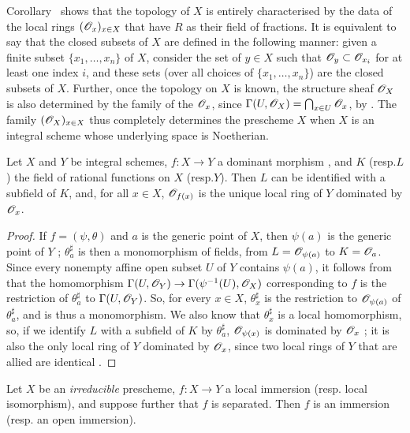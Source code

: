 \begin{env}[8.2.6]
\label{I.8.2.6}
Corollary~ shows that the topology of $X$ is entirely characterised by the data of the local rings $(\mathscr{O}_x)_{x\in X}$ that have $R$ as their field of fractions.
It is equivalent to say that the closed subsets of $X$ are defined in the following manner: given a finite subset $\{x_1,\ldots,x_n\}$ of $X$, consider the set of $y\in X$ such that $\mathscr{O}_y\subset\mathscr{O}_{x_i}$ for at least one index $i$, and these sets (over all choices of $\{x_1,\ldots,x_n\}$) are the closed subsets of $X$.
Further, once the topology on $X$ is known, the structure sheaf $\mathscr{O}_X$ is also determined by the family of the $\mathscr{O}_x$, since $\Gamma(U,\mathscr{O}_X)=\bigcap_{x\in U}\mathscr{O}_x$, by .
The family $(\mathscr{O}_X)_{x\in X}$ thus completely determines the prescheme $X$ when $X$ is an integral scheme whose underlying space is Noetherian.
\end{env}

\begin{proposition}[8.2.7]
\label{I.8.2.7}
Let $X$ and $Y$ be integral schemes, $f:X\to Y$ a dominant morphism , and $K$ (resp.$L$) the field of rational functions on $X$ (resp.$Y$).
Then $L$ can be identified with a subfield of $K$, and, for all $x\in X$, $\mathscr{O}_{f(x)}$ is the unique local ring of $Y$ dominated by $\mathscr{O}_x$.
\end{proposition}

\begin{proof}
If $f=(\psi,\theta)$ and $a$ is the generic point of $X$, then $\psi(a)$ is the generic point of $Y$ ;
$\theta_a^\sharp$ is then a monomorphism of fields, from $L=\mathscr{O}_{\psi(a)}$ to $K=\mathscr{O}_a$.
Since every nonempty affine open subset $U$ of $Y$ contains $\psi(a)$, it follows from  that the homomorphism $\Gamma(U,\sh{O}_Y)\to\Gamma(\psi^{-1}(U),\sh{O}_X)$ corresponding to $f$ is the restriction of $\theta_a^\sharp$ to $\Gamma(U,\mathscr{O}_Y)$.
So, for every $x\in X$, $\theta_x^\sharp$ is the restriction to $\mathscr{O}_{\psi(a)}$ of $\theta_a^\sharp$, and is thus a monomorphism.
We also know that $\theta_x^\sharp$ is a local homomorphism, so, if we identify $L$ with a subfield of $K$ by $\theta_a^\sharp$, $\mathscr{O}_{\psi(x)}$ is dominated by $\mathscr{O}_x$ ;
it is also the only local ring of $Y$ dominated by $\mathscr{O}_x$, since two local rings of $Y$ that are allied are identical .
\end{proof}

\begin{proposition}[8.2.8]
\label{I.8.2.8}
Let $X$ be an \emph{irreducible} prescheme, $f:X\to Y$ a local immersion (resp. local isomorphism), and suppose further that $f$ is separated. Then $f$ is an immersion (resp. an open immersion).
\end{proposition}

